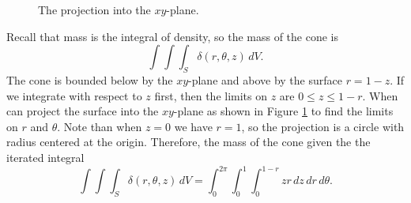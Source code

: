 \begin{activity}
\begin{figure}[ht]
\begin{center}
\begin{minipage}{2.5in}
\begin{center}
\end{center}
\caption{The projection into the $xy$-plane.}
\label{F:11.8.Cylindrical_proj}
\end{minipage}
\end{center}
\end{figure}



\end{activity}
\begin{smallhint}

\end{smallhint}
\begin{bighint}

\end{bighint}
\begin{activitySolution}
Recall that mass is the integral of density, so the mass of the cone is
\[\int \int \int_S \delta(r, \theta, z) \, dV.\]
The cone is bounded below by the $xy$-plane and above by the surface $r=1-z$. If we integrate with respect to $z$ first, then the limits on $z$ are $0 \leq z \leq 1-r$. When can project the surface into the $xy$-plane as shown in Figure \ref{F:11.8.Cylindrical_proj} to find the limits on $r$ and $\theta$. Note than when $z=0$ we have $r=1$, so the projection is a circle with radius centered at the origin. Therefore, the mass of the cone given the the iterated integral
\[\int \int \int_S \delta(r, \theta, z) \, dV = \int_0^{2\pi} \int_0^1 \int_0^{1-r} zr \, dz \, dr \, d\theta.\]
\end{activitySolution}
\aftera
